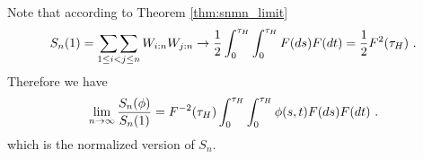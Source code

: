 %
\begin{remark}
	Note that according to Theorem \ref{thm:snmn_limit} 
	\begin{equation*}
		S_n(1) = \mathop{\sum\sum}\limits_{1\leq i<j \leq n} W_{i:n} W_{j:n} \to  \frac{1}{2}\int_{0}^{\tau_H} \int_{0}^{\tau_H} F(ds)F(dt) = \frac{1}{2} F^{2}(\tau_H)\textrm{ .}
	\end{equation*}
	Therefore we have 
	\begin{equation*}
		\lim\limits_{n\to\infty}\frac{S_n(\phi)}{S_n(1)} = F^{-2}(\tau_H) \int_{0}^{\tau_H} \int_{0}^{\tau_H} \phi(s,t)F(ds)F(dt)\textrm{ .}
	\end{equation*}
	which is the normalized version of $S_n$.
\end{remark}


